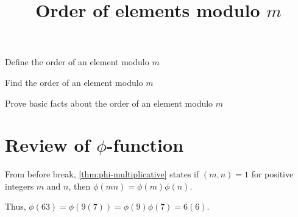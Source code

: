 \documentclass{ximera}
\title{Order of elements modulo $m$}
\begin{document}
\begin{abstract}
\end{abstract}
\maketitle


\begin{obj}
    \item Define the order of an element modulo $m$
    \item Find the order of an element modulo $m$
    \item Prove basic facts about the order of an element modulo $m$
\end{obj}


\section{Review of $\phi$-function}

\begin{remark}
    From before break, \cref{thm:phi-multiplicative} states if $(m,n)=1$ for positive integers $m$ and $n$, then $\phi(mn)=\phi(m)\phi(n).$ 

    Thus, $\phi(63)=\phi(9(7))=\phi(9)\phi(7)=6(6).$
\end{remark}
\end{document}
